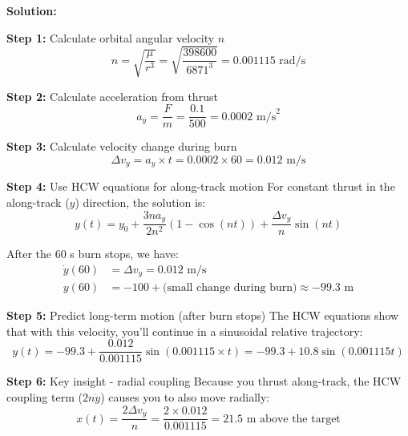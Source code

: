 \documentclass[11pt,a4paper]{article}
\begin{document}
\textbf{Solution:}

\textbf{Step 1:} Calculate orbital angular velocity $n$
\begin{equation}
n = \sqrt{\frac{\mu}{r^3}} = \sqrt{\frac{398600}{6871^3}} = 0.001115 \text{ rad/s}
\end{equation}

\textbf{Step 2:} Calculate acceleration from thrust
\begin{equation}
a_y = \frac{F}{m} = \frac{0.1}{500} = 0.0002 \text{ m/s}^2
\end{equation}

\textbf{Step 3:} Calculate velocity change during burn
\begin{equation}
\Delta v_y = a_y \times t = 0.0002 \times 60 = 0.012 \text{ m/s}
\end{equation}

\textbf{Step 4:} Use HCW equations for along-track motion
For constant thrust in the along-track ($y$) direction, the solution is:
\begin{equation}
y(t) = y_0 + \frac{3n a_y}{2n^2}(1 - \cos(nt)) + \frac{\Delta v_y}{n}\sin(nt)
\end{equation}

After the 60 s burn stops, we have:
\begin{align}
\dot{y}(60) &= \Delta v_y = 0.012 \text{ m/s} \\
y(60) &= -100 + \text{(small change during burn)} \approx -99.3 \text{ m}
\end{align}

\textbf{Step 5:} Predict long-term motion (after burn stops)
The HCW equations show that with this velocity, you'll continue in a sinusoidal relative trajectory:
\begin{equation}
y(t) = -99.3 + \frac{0.012}{0.001115}\sin(0.001115 \times t) = -99.3 + 10.8\sin(0.001115t)
\end{equation}

\textbf{Step 6:} Key insight - radial coupling
Because you thrust along-track, the HCW coupling term ($2n\dot{y}$) causes you to also move radially:
\begin{equation}
x(t) = \frac{2\Delta v_y}{n} = \frac{2 \times 0.012}{0.001115} = 21.5 \text{ m above the target}
\end{equation}
\end{document}
